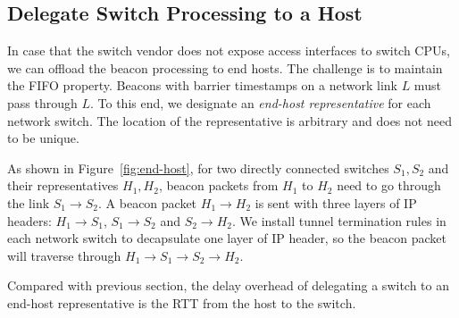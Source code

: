 \subsection{Delegate Switch Processing to a Host}
\label{sec:end-host}

In case that the switch vendor does not expose access interfaces to switch CPUs, we can offload the beacon processing to end hosts. The challenge is to maintain the FIFO property.
Beacons with barrier timestamps on a network link $L$ must pass through $L$.
To this end, we designate an \textit{end-host representative} for each network switch.
The location of the representative is arbitrary and does not need to be unique.

As shown in Figure~\ref{fig:end-host}, for two directly connected switches $S_1, S_2$ and their representatives $H_1, H_2$, beacon packets from $H_1$ to $H_2$ need to go through the link $S_1 \rightarrow S_2$.
A beacon packet $H_1 \rightarrow H_2$ is sent with three layers of IP headers: $H_1 \rightarrow S_1$, $S_1 \rightarrow S_2$ and $S_2 \rightarrow H_2$.
We install tunnel termination rules in each network switch to decapsulate one layer of IP header, so the beacon packet will traverse through $H_1 \rightarrow S_1 \rightarrow S_2 \rightarrow H_2$.

Compared with previous section, the delay overhead of delegating a switch to an end-host representative is the RTT from the host to the switch.
